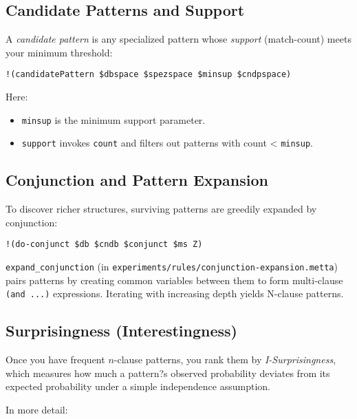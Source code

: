\documentclass{article}
\begin{document}
\subsection{Candidate Patterns and Support}

A \emph{candidate pattern} is any specialized pattern whose \emph{support} (match-count) meets your minimum threshold:

\begin{verbatim}
!(candidatePattern $dbspace $spezspace $minsup $cndpspace)
\end{verbatim}

Here:
\begin{itemize}
  \item \texttt{minsup} is the minimum support parameter.
  \item \texttt{support} invokes \texttt{count} and filters out patterns with count < \texttt{minsup}.
\end{itemize}

\subsection{Conjunction and Pattern Expansion}

To discover richer structures, surviving patterns are greedily expanded by conjunction:

\begin{verbatim}
!(do-conjunct $db $cndb $conjunct $ms Z)
\end{verbatim}

\texttt{expand_conjunction} (in \texttt{experiments/rules/conjunction-expansion.metta}) pairs patterns by creating common variables between them to form multi-clause \verb|(and ...)| expressions.  Iterating with increasing depth yields N-clause patterns.

\subsection{Surprisingness (Interestingness)}

Once you have frequent $n$-clause patterns, you rank them by \emph{I-Surprisingness}, which measures how much a pattern?s observed probability deviates from its expected probability under a simple independence assumption.  

In more detail:
\end{document}
